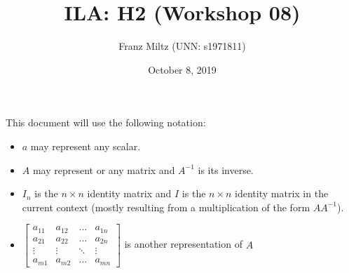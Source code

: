 \documentclass{article}
\title{ILA: H2 (Workshop 08)}
\author{Franz Miltz (UNN: s1971811)}
\date{October 8, 2019}
\begin{document}
\maketitle
This document will use the following notation:
\begin{itemize}
    \item $a$ may represent any scalar.
    \item $A$ may represent or any matrix and $A^{-1}$ is its inverse.
    \item $I_n$ is the $n\times n$ identity matrix and $I$ is the $n\times n$ identity matrix in the current context (mostly resulting from a multiplication of the form $AA^{-1}$).
    \item $\begin{bmatrix}
        a_{11} & a_{12}&\dots &a_{1n}\\
        a_{21} & a_{22}&\dots &a_{2n}\\
        \vdots & \vdots & \ddots & \vdots\\
        a_{m1} & a_{m2} &\dots &a_{mn}
    \end{bmatrix}$ is another representation of $A$
\end{itemize}
\end{document}
